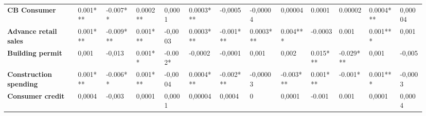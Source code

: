 \begin{landscape}
\begin{table}[]
{\begin{tabular}{@{}lllllllllllll@{}}
\textbf{CB Consumer}              & 0.001***                              & -0.007**                              & 0.0002**                              & 0,0001                                & 0.0003***                             & -0,0005                               & -0,00004                              & 0,00004                               & 0.0001                                & 0.00002                               & 0.0004***                             & 0,00004                               \\
\textbf{Advance retail sales}     & 0.001***                              & -0.009***                             & 0.001***                              & -0,0003                               & 0.0003***                             & -0.001***                             & 0.0003***                             & 0.004***                              & -0.0003                               & 0.001                                 & 0.001***                              & 0,001                                 \\
\textbf{Building permit}          & 0,001                                 & -0,013                                & 0.001**                               & -0.002*                               & -0,0002                               & -0,0001                               & 0,001                                 & 0,002                                 & 0.015***                              & -0.029***                             & 0,001                                 & -0,005                                \\
\textbf{Construction spending}    & 0.001***                              & -0.006**                              & 0.001***                              & -0,0004                               & 0.0004***                             & -0.002***                             & -0,00003                              & -0.003***                             & 0.001***                              & -0.001*                               & 0.001***                              & -0,0003                               \\
\textbf{Consumer credit}          & 0,0004                                & -0,003                                & 0,0001                                & 0,0001                                & 0,00004                               & 0,0004                                & 0                                     & 0,0001                                & -0.001                                & 0.001                                 & 0,0001                                & 0,0004                                \\

\end{tabular}}
\end{table}
\end{landscape}
